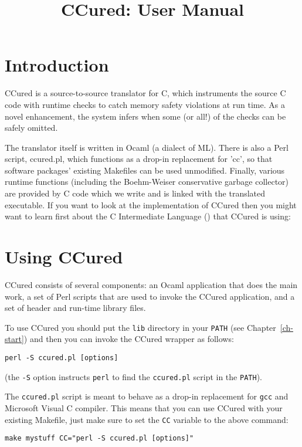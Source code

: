 \documentclass{book}
\title{CCured: User Manual}
\def\t#1{{\tt #1}}
\def\chref#1{Chapter~\ref{ch-#1}}
\begin{document}
\maketitle
\chapter{Introduction}

CCured is a source-to-source translator for C, which instruments the source C
code with runtime checks to catch memory safety violations at run time. As a
novel enhancement, the system infers when some (or all!) of the checks can be
safely omitted.

 The translator itself is written in Ocaml (a dialect of ML).  There is
also a Perl script, ccured.pl, which functions as a drop-in
replacement for 'cc', so that software packages' existing Makefiles
can be used unmodified.  Finally, various runtime functions (including
the Boehm-Weiser conservative garbage collector) are provided by C
code which we write and is linked with the translated executable. If you want
to look at the implementation of CCured then you might want to learn first
about the C Intermediate Language () that CCured is using:
 

 
\chapter{Using CCured}

 CCured consists of several components: an Ocaml application that does the
main work, a set of Perl scripts that are used to invoke the CCured
application, and a set of header and run-time library files. 

 To use CCured you should put the \t{lib} directory in your \t{PATH} (see
\chref{start}) and then you can invoke the CCured wrapper as follows:
\begin{verbatim}
perl -S ccured.pl [options]
\end{verbatim}

 (the \t{-S} option instructs \t{perl} to find the \t{ccured.pl} script in the
 \t{PATH}). 

 The \t{ccured.pl} script is meant to behave as a drop-in replacement for
\t{gcc} and Microsoft Visual C compiler. This means that you can use CCured
with your existing Makefile, just make sure to set the \t{CC} variable to the
above command:
\begin{verbatim}
make mystuff CC="perl -S ccured.pl [options]"
\end{verbatim}
\end{document}

